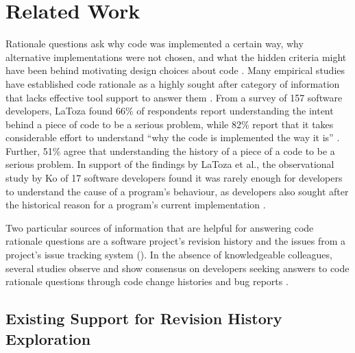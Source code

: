 \chapter{Related Work}
\label{ch:Related-Work}

Rationale questions ask why code was implemented a certain way, 
why alternative implementations were not chosen, and what the hidden criteria might have been 
behind motivating design choices about code \cite{latoza_hard-answer_2010}.
Many empirical studies have established code rationale as a highly sought after category of 
information that lacks effective tool support to answer them \cite{latoza_maintaining_2006, latoza_hard-answer_2010, ko_information_2007}. 
From a survey of 157 software developers, LaToza \etal found 66\% of respondents report understanding 
the intent behind a piece of code to be a serious problem, 
while 82\% report that it takes considerable effort to understand ``why the code is implemented the way it is'' \cite{latoza_maintaining_2006}.
Further, 51\% agree that understanding the history of a piece of a code to be a serious problem.
In support of the findings by LaToza et al., the observational study by Ko \etal of 17 software 
developers found it was rarely enough for developers to understand the cause of a program's behaviour, 
as developers also sought after the historical reason for a program's current implementation \cite{ko_information_2007}.

Two particular sources of information that are helpful for answering code rationale questions 
are a software project's revision history and the issues from a project's issue tracking system (). 
In the absence of knowledgeable colleagues, several studies observe and show consensus 
on developers seeking answers to code rationale questions through code change histories 
and bug reports \cite{ko_information_2007, codoban_software_2015, robillard_turnover-induced_2021}.


\pagebreak
\section{Existing Support for Revision History Exploration}

